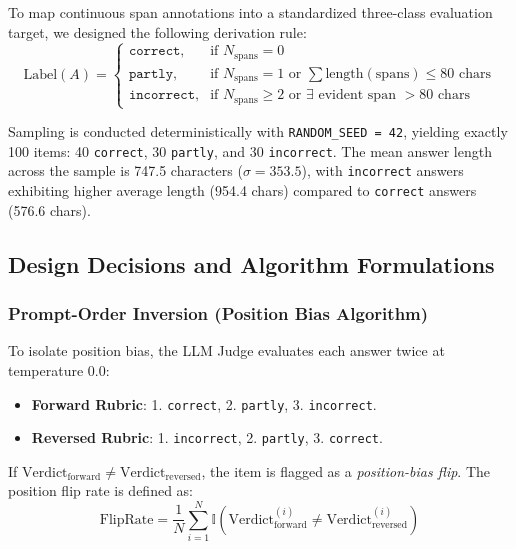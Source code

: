 \documentclass[11pt,a4paper]{article}
\begin{document}
To map continuous span annotations into a standardized three-class evaluation target, we designed the following derivation rule:
\begin{equation}
\text{Label}(A) = 
\begin{cases} 
\texttt{correct}, & \text{if } N_{\text{spans}} = 0 \\
\texttt{partly}, & \text{if } N_{\text{spans}} = 1 \text{ or } \sum \text{length}(\text{spans}) \le 80 \text{ chars} \\
\texttt{incorrect}, & \text{if } N_{\text{spans}} \ge 2 \text{ or } \exists \text{ evident span } > 80 \text{ chars}
\end{cases}
\end{equation}

Sampling is conducted deterministically with \texttt{RANDOM\_SEED = 42}, yielding exactly 100 items: 40 \texttt{correct}, 30 \texttt{partly}, and 30 \texttt{incorrect}. The mean answer length across the sample is 747.5 characters ($\sigma = 353.5$), with \texttt{incorrect} answers exhibiting higher average length (954.4 chars) compared to \texttt{correct} answers (576.6 chars).

\subsection{Design Decisions and Algorithm Formulations}

\subsubsection{Prompt-Order Inversion (Position Bias Algorithm)}
To isolate position bias, the LLM Judge evaluates each answer twice at temperature 0.0:
\begin{itemize}[leftmargin=*]
    \item \textbf{Forward Rubric}: 1. \texttt{correct}, 2. \texttt{partly}, 3. \texttt{incorrect}.
    \item \textbf{Reversed Rubric}: 1. \texttt{incorrect}, 2. \texttt{partly}, 3. \texttt{correct}.
\end{itemize}
If $\text{Verdict}_{\text{forward}} \ne \text{Verdict}_{\text{reversed}}$, the item is flagged as a \textit{position-bias flip}. The position flip rate is defined as:
\begin{equation}
\text{FlipRate} = \frac{1}{N} \sum_{i=1}^{N} \mathbb{I}\left(\text{Verdict}_{\text{forward}}^{(i)} \ne \text{Verdict}_{\text{reversed}}^{(i)}\right)
\end{equation}
\end{document}

